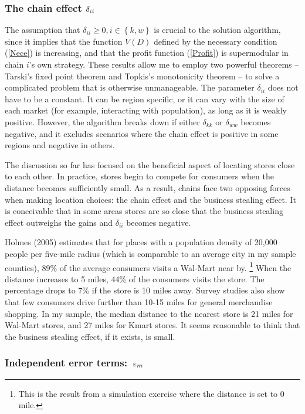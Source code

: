 \documentclass[notitlepage,onecolumn,11pt]{article}
\begin{document}
\subsubsection{The chain effect $\protect\delta _{ii}$ \label{Delta}}

The assumption that $\delta _{ii}\geq 0,i\in \left\{ k,w\right\} $ is
crucial to the solution algorithm, since it implies that the function $V(D)$
defined by the necessary condition (\ref{Nece}) is increasing, and that the
profit function (\ref{Profit}) is supermodular in chain $i$'s own strategy.
These results allow me to employ two powerful theorems -- Tarski's fixed
point theorem and Topkis's monotonicity theorem -- to solve a complicated
problem that is otherwise unmanageable. The parameter $\delta _{ii}$ does
not have to be a constant. It can be region specific, or it can vary with
the size of each market (for example, interacting with population), as long
as it is weakly positive. However, the algorithm breaks down if either $%
\delta _{kk}$ or $\delta _{ww}$ becomes negative, and it excludes scenarios
where the chain effect is positive in some regions and negative in others.

The discussion so far has focused on the beneficial aspect of locating
stores close to each other. In practice, stores begin to compete for
consumers when the distance becomes sufficiently small. As a result, chains
face two opposing forces when making location choices: the chain effect and
the business stealing effect. It is conceivable that in some areas stores
are so close that the business stealing effect outweighs the gains and $%
\delta _{ii}$ becomes negative.

Holmes (2005) estimates that for places with a population density of 20,000
people per five-mile radius (which is comparable to an average city in my
sample counties), 89\% of the average consumers visits a Wal-Mart near by.%
\footnote{%
This is the result from a simulation exercise where the distance is set to 0
mile.} When the distance increases to 5 miles, 44\% of the consumers visits
the store. The percentage drops to 7\% if the store is 10 miles away. Survey
studies also show that few consumers drive further than 10-15 miles for
general merchandise shopping. In my sample, the median distance to the
nearest store is 21 miles for Wal-Mart stores, and 27 miles for Kmart
stores. It seems reasonable to think that the business stealing effect, if
it exists, is small.

\subsubsection{Independent error terms:\ $\protect\varepsilon _{m}$}
\end{document}
